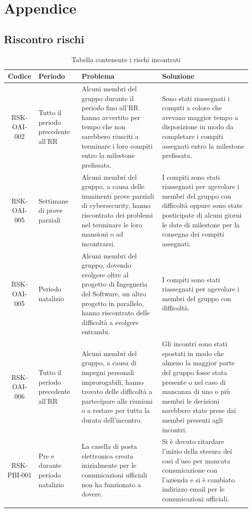 \section{Appendice}

	\subsection{Riscontro rischi}

		\begin{center}
			\begin{longtable}{|c|p{3cm}|p{4cm}|p{4cm}|}
			\hline
			\rowcolor{lighter-grayer}
			\textbf{Codice} & \textbf{Periodo} & \textbf{Problema} & \textbf{Soluzione} \\
			\hline
			\endfirsthead

			\hline
			RSK-OAI-002 & Tutto il periodo precedente all'RR & Alcuni membri del gruppo durante il periodo fino all'RR hanno avvertito per tempo che non sarebbero riusciti a terminare i loro compiti entro la milestone prefissata. & Sono stati riassegnati i compiti a coloro che avevano maggior tempo a disposizione in modo da completare i compiti assegnati entro la milestone prefissata. \\
			\hline
			\hline
			RSK-OAI-005 & Settimane di prove parziali & Alcuni membri del gruppo, a causa delle imminenti prove parziali di cybersecurity, hanno riscontrato dei problemi nel terminare le loro mansioni o ad incontrarsi. & I compiti sono stati riassegnati per agevolare i membri del gruppo con difficoltà oppure sono state posticipate di alcuni giorni le date di milestone per la consegna dei compiti assegnati.  \\
			\hline
			\hline
			RSK-OAI-005 & Periodo natalizio & Alcuni membri del gruppo, dovendo svolgere oltre al progetto di Ingegneria del Software, un altro progetto in parallelo, hanno riscontrato delle difficoltà a svolgere entrambi. & I compiti sono stati riassegnati per agevolare i membri del gruppo con difficoltà.  \\
			\hline
			\hline
			RSK-OAI-006 & Tutto il periodo precedente all'RR & Alcuni membri del gruppo, a causa di impegni personali improrogabili, hanno trovato delle difficoltà a partecipare alle riunioni o a restare per tutta la durata dell'incontro. & Gli incontri sono stati spostati in modo che almeno la maggior parte del gruppo fosse stata presente o nel caso di mancanza di uno o più membri le decisioni sarebbero state prese dai membri presenti agli incontri. \\
			\hline
			\hline
			RSK-PBI-001 & Pre e durante periodo natalizio & La casella di posta elettronica creata inizialmente per le comunicazioni ufficiali non ha funzionato a dovere. & Si è dovuto ritardare l'inizio della stesura dei casi d'uso per mancata comunicazione con l'azienda e si è cambiato indirizzo email per le comunicazioni ufficiali. \\
			\hline
			\caption{Tabella contenente i rischi incontrati}
			\end{longtable}
		\end{center}

